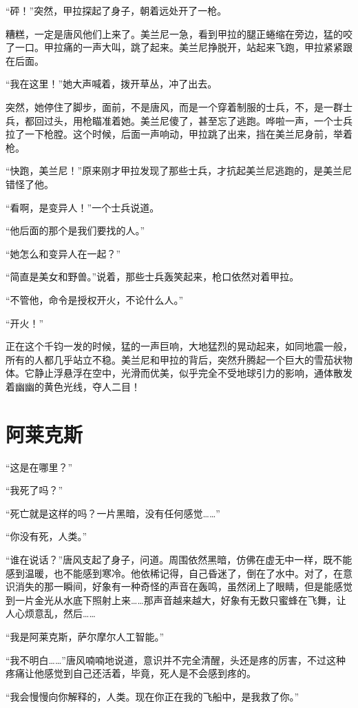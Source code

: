 “砰！”突然，甲拉探起了身子，朝着远处开了一枪。

糟糕，一定是唐风他们上来了。美兰尼一急，看到甲拉的腿正蜷缩在旁边，猛的咬了一口。甲拉痛的一声大叫，跳了起来。美兰尼挣脱开，站起来飞跑，甲拉紧紧跟在后面。

“我在这里！”她大声喊着，拨开草丛，冲了出去。

突然，她停住了脚步，面前，不是唐风，而是一个穿着制服的士兵，不，是一群士兵，都回过头，用枪瞄准着她。美兰尼傻了，甚至忘了逃跑。哗啦一声，一个士兵拉了一下枪膛。这个时候，后面一声响动，甲拉跳了出来，挡在美兰尼身前，举着枪。

“快跑，美兰尼！”原来刚才甲拉发现了那些士兵，才抗起美兰尼逃跑的，是美兰尼错怪了他。

“看啊，是变异人！”一个士兵说道。

“他后面的那个是我们要找的人。”

“她怎么和变异人在一起？”

“简直是美女和野兽。”说着，那些士兵轰笑起来，枪口依然对着甲拉。

“不管他，命令是授权开火，不论什么人。”

“开火！”

正在这个千钧一发的时候，猛的一声巨响，大地猛烈的晃动起来，如同地震一般，所有的人都几乎站立不稳。美兰尼和甲拉的背后，突然升腾起一个巨大的雪茄状物体。它静止浮悬浮在空中，光滑而优美，似乎完全不受地球引力的影响，通体散发着幽幽的黄色光线，夺人二目！

\chapter{阿莱克斯}

“这是在哪里？”

“我死了吗？”

“死亡就是这样的吗？一片黑暗，没有任何感觉……”

“你没有死，人类。”

“谁在说话？”唐风支起了身子，问道。周围依然黑暗，仿佛在虚无中一样，既不能感到温暖，也不能感到寒冷。他依稀记得，自己昏迷了，倒在了水中。对了，在意识消失的那一瞬间，好象有一种奇怪的声音在轰鸣，虽然闭上了眼睛，但是能感觉到一片金光从水底下照射上来……那声音越来越大，好象有无数只蜜蜂在飞舞，让人心烦意乱，然后……

“我是阿莱克斯，萨尔摩尔人工智能。”

“我不明白……”唐风喃喃地说道，意识并不完全清醒，头还是疼的厉害，不过这种疼痛让他感觉到自己还活着，毕竟，死人是不会感到疼的。

“我会慢慢向你解释的，人类。现在你正在我的飞船中，是我救了你。”

